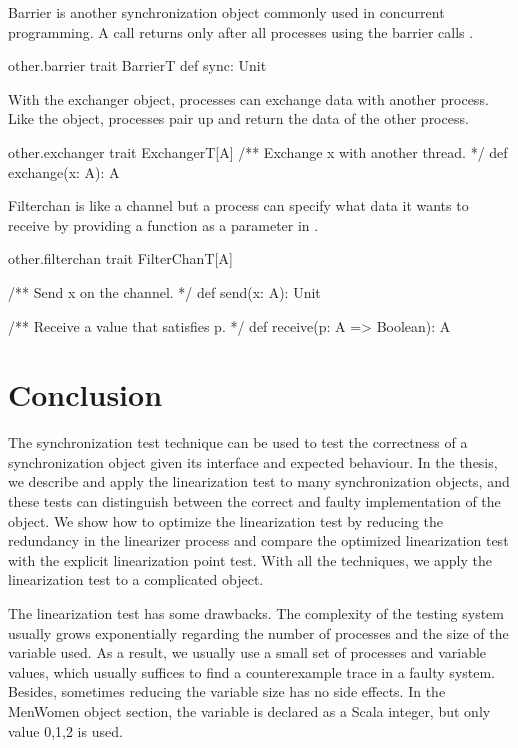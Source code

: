 \documentclass[a4paper, 12pt]{article}
\begin{document}
Barrier is another synchronization object commonly used in concurrent programming. A  call returns only after all processes using the barrier calls . 
\begin{scalafloat}{other.barrier}{}
trait BarrierT{
  def sync: Unit
}    
\end{scalafloat}

With the exchanger object, processes can exchange data with another process. Like the  object, processes pair up and return the data of the other process.
\begin{scalafloat}{other.exchanger}{}
trait ExchangerT[A]{
  /** Exchange x with another thread. */
  def exchange(x: A): A
}
\end{scalafloat}

Filterchan is like a channel but a process can specify what data it wants to receive by providing a function as a parameter in .
\begin{scalafloat}{other.filterchan}{}
trait FilterChanT[A]{
  /** Send x on the channel. */
  def send(x: A): Unit

  /** Receive a value that satisfies p. */
  def receive(p: A => Boolean): A
}
\end{scalafloat}

\newpage
\section{Conclusion}
The synchronization test technique can be used to test the correctness of a synchronization object given its interface and expected behaviour. In the thesis, we describe and apply the linearization test to many synchronization objects, and these tests can distinguish between the correct and faulty implementation of the object. We show how to optimize the linearization test by reducing the redundancy in the linearizer process and compare the optimized linearization test with the explicit linearization point test. With all the techniques, we apply the linearization test to a complicated object. 

The linearization test has some drawbacks. The complexity of the testing system usually grows exponentially regarding the number of processes and the size of the variable used. As a result, we usually use a small set of processes and variable values, which usually suffices to find a counterexample trace in a faulty system. Besides, sometimes reducing the variable size has no side effects. In the MenWomen object section, the variable  is declared as a Scala integer, but only value 0,1,2 is used.
\end{document}
